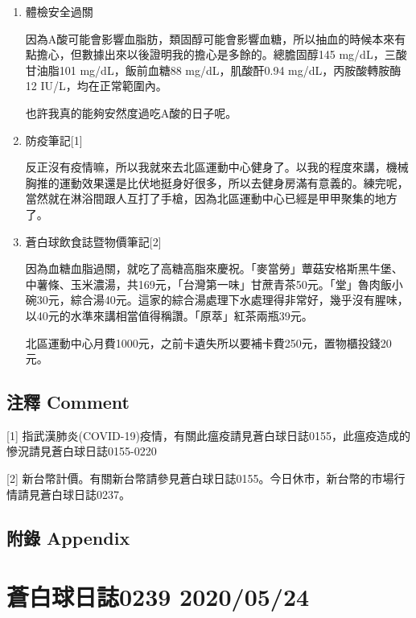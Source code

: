 \documentclass[a5paper, 11pt
]{book}
\begin{document}
\begin{enumerate}
\def\labelenumi{\arabic{enumi}.}
\item
  體檢安全過關

  因為A酸可能會影響血脂肪，類固醇可能會影響血糖，所以抽血的時候本來有點擔心，但數據出來以後證明我的擔心是多餘的。總膽固醇145
  mg/dL，三酸甘油脂101 mg/dL，飯前血糖88 mg/dL，肌酸酐0.94
  mg/dL，丙胺酸轉胺酶12 IU/L，均在正常範圍內。

  也許我真的能夠安然度過吃A酸的日子呢。
\item
  防疫筆記{[}1{]}

  反正沒有疫情嘛，所以我就來去北區運動中心健身了。以我的程度來講，機械胸推的運動效果還是比伏地挺身好很多，所以去健身房滿有意義的。練完呢，當然就在淋浴間跟人互打了手槍，因為北區運動中心已經是甲甲聚集的地方了。
\item
  蒼白球飲食誌暨物價筆記{[}2{]}

  因為血糖血脂過關，就吃了高糖高脂來慶祝。「麥當勞」蕈菇安格斯黑牛堡、中薯條、玉米濃湯，共169元，「台灣第一味」甘蔗青茶50元。「堂」魯肉飯小碗30元，綜合湯40元。這家的綜合湯處理下水處理得非常好，幾乎沒有腥味，以40元的水準來講相當值得稱讚。「原萃」紅茶兩瓶39元。

  北區運動中心月費1000元，之前卡遺失所以要補卡費250元，置物櫃投錢20元。
\end{enumerate}

\hypertarget{ux6ce8ux91cb-comment-83}{%
\subsection{注釋 Comment}\label{ux6ce8ux91cb-comment-83}}

{[}1{]}
指武漢肺炎(COVID-19)疫情，有關此瘟疫請見蒼白球日誌0155，此瘟疫造成的慘況請見蒼白球日誌0155-0220

{[}2{]}
新台幣計價。有關新台幣請參見蒼白球日誌0155。今日休市，新台幣的市場行情請見蒼白球日誌0237。

\hypertarget{ux9644ux9304-appendix-83}{%
\subsection{附錄 Appendix}\label{ux9644ux9304-appendix-83}}

\hypertarget{ux84bcux767dux7403ux65e5ux8a8c0239-20200524}{%
\section{蒼白球日誌0239
2020/05/24}\label{ux84bcux767dux7403ux65e5ux8a8c0239-20200524}}
\end{document}
